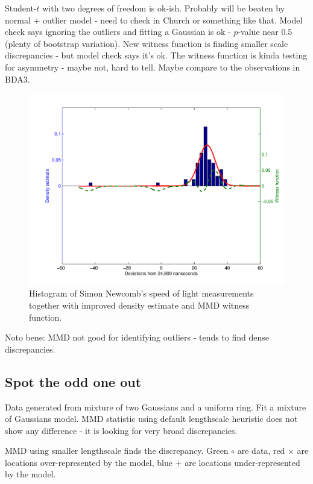 \documentclass{article}
\begin{document}
Student-$t$ with two degrees of freedom is ok-ish.
Probably will be beaten by normal + outlier model - need to check in Church or something like that.
Model check says ignoring the outliers and fitting a Gaussian is ok - $p$-value near 0.5 (plenty of bootstrap variation).
New witness function is finding smaller scale discrepancies - but model check says it's ok.
The witness function is kinda testing for asymmetry - maybe not, hard to tell.
Maybe compare to the observations in BDA3.

\begin{figure}[ht]
\centering
\includegraphics[width=0.98\columnwidth]{figures/newcomb_witness_2}
\caption{
Histogram of Simon Newcomb's speed of light measurements together with improved density estimate and MMD witness function.
}
\label{fig:newcomb_witness_1}
\end{figure}

Noto bene: MMD not good for identifying outliers - tends to find dense discrepancies.

\subsection{Spot the odd one out}

Data generated from mixture of two Gaussians and a uniform ring.
Fit a mixture of Gaussians model.
MMD statistic using default lengthscale heuristic does not show any difference - it is looking for very broad discrepancies.

MMD using smaller lengthscale finds the discrepancy.
Green $\circ$ are data, red $\times$ are locations over-represented by the model, blue $+$ are locations under-represented by the model.
\end{document}
